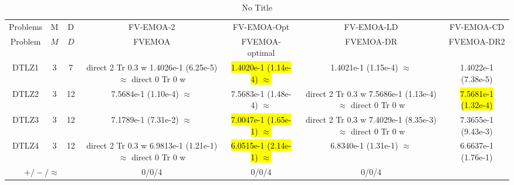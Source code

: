 \documentclass[journal]{IEEEtran}
\newcommand{\semitextbf}[1]{%
\pdfliteral direct {2 Tr 0.3 w} %
#1%
\pdfliteral direct {0 Tr 0 w}%
}
\begin{document}
\begin{table*}[htbp]
\renewcommand{\arraystretch}{1.2}
\centering
\caption{No Title}
\begin{tabular}{ccccccc}
\toprule
 Problems        & M  & D & FV-EMOA-2                         & FV-EMOA-Opt                       & FV-EMOA-LD                        & FV-EMOA-CD                           \\ 
    
Problem&$M$&$D$&FVEMOA&FVEMOA-optimal&FVEMOA-DR&FVEMOA-DR2\\
\midrule
\multirow{1}{*}{DTLZ1}&3&7&\semitextbf{1.4026e-1 (6.25e-5) $\approx$}&\hl{1.4020e-1 (1.14e-4) $\approx$}&1.4021e-1 (1.15e-4) $\approx$&1.4022e-1 (7.38e-5)\\
\hline
\multirow{1}{*}{DTLZ2}&3&12&7.5684e-1 (1.10e-4) $\approx$&7.5683e-1 (1.48e-4) $\approx$&\semitextbf{7.5686e-1 (1.13e-4) $\approx$}&\hl{7.5681e-1 (1.32e-4)}\\
\hline
\multirow{1}{*}{DTLZ3}&3&12&7.1789e-1 (7.31e-2) $\approx$&\hl{7.0047e-1 (1.65e-1) $\approx$}&\semitextbf{7.4029e-1 (8.35e-3) $\approx$}&7.3655e-1 (9.43e-3)\\
\hline
\multirow{1}{*}{DTLZ4}&3&12&\semitextbf{6.9813e-1 (1.21e-1) $\approx$}&\hl{6.0515e-1 (2.14e-1) $\approx$}&6.8340e-1 (1.31e-1) $\approx$&6.6637e-1 (1.76e-1)\\
\hline
\multicolumn{3}{c}{$+/-/\approx$}&0/0/4&0/0/4&0/0/4&\\
\bottomrule
\end{tabular}
\label{No Label}
\end{table*}
\end{document}
